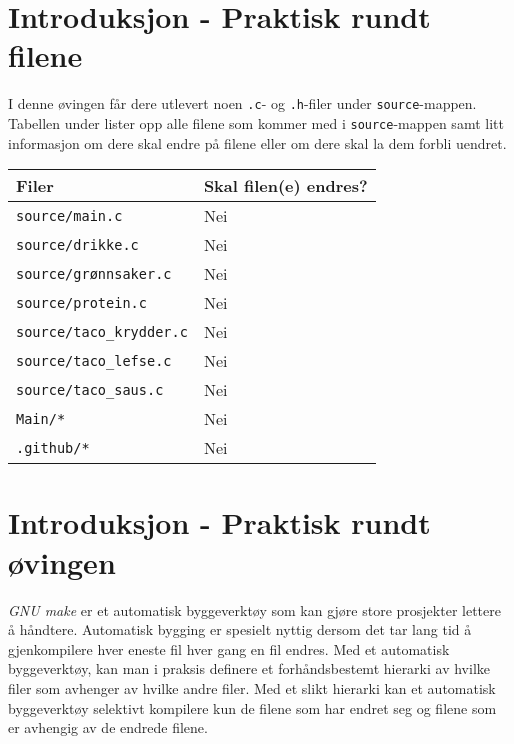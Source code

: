 \begin{alphasection}

\section{Introduksjon - Praktisk rundt filene}

I denne øvingen får dere utlevert noen \verb|.c|- og \verb|.h|-filer under \verb|source|-mappen. Tabellen under lister opp alle filene som kommer med i \verb|source|-mappen samt litt informasjon om dere skal endre på filene eller om dere skal la dem forbli uendret.

\begin{center}
 \begin{tabular}{|p{8.5cm} p{5.5cm}|} 
 \hline
 \textbf{Filer} & \textbf{Skal filen(e) endres?}  \\ [0.5ex] 
 \hline\hline
  \verb|source/main.c| & Nei  \\ 
 \hline
 \verb|source/drikke.c| & Nei  \\ 
 \hline
 \verb|source/grønnsaker.c| & Nei  \\ 
 \hline
 \verb|source/protein.c| & Nei  \\ 
 \hline
 \verb|source/taco_krydder.c| & Nei  \\
 \hline
 \verb|source/taco_lefse.c| & Nei  \\ 
 \hline
  \verb|source/taco_saus.c| & Nei  \\ 
 \hline
   \verb|Main/*| & Nei  \\ 
 \hline
  \verb|.github/*| & Nei \\
 \hline 
\end{tabular}
\end{center}

\section{Introduksjon - Praktisk rundt øvingen}

 \textit{GNU make} er et automatisk byggeverktøy som kan gjøre store prosjekter lettere å håndtere. Automatisk bygging er spesielt nyttig dersom det tar lang tid å gjenkompilere hver eneste fil hver gang en fil endres. Med et automatisk byggeverktøy, kan man i praksis definere et forhåndsbestemt hierarki av hvilke filer som avhenger av hvilke andre filer. Med et slikt hierarki kan et automatisk byggeverktøy selektivt kompilere kun de filene som har endret seg og filene som er avhengig av de endrede filene.
 

\end{alphasection}
